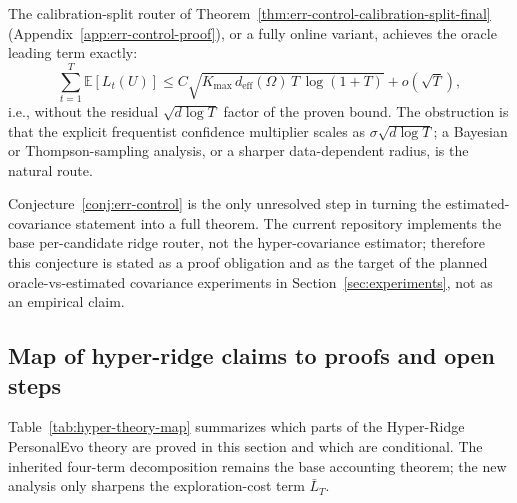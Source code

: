 \documentclass{article} %
\begin{document}
\begin{conjecture}
\label{conj:err-control}
The calibration-split router of Theorem~\ref{thm:err-control-calibration-split-final} (Appendix~\ref{app:err-control-proof}), or a fully online variant, achieves the oracle leading term exactly:
\begin{equation}
\label{eq:hyper-conj-err}
\sum_{t=1}^{T}\mathbb{E}[L_t(U)]
\le C\sqrt{K_{\max}\,d_{\mathrm{eff}}(\Omega)\,T\,\log(1+T)}
+ o(\sqrt{T}),
\end{equation}
i.e., without the residual $\sqrt{d\log T}$ factor of the proven bound. The obstruction is that the explicit frequentist confidence multiplier scales as $\sigma\sqrt{d\log T}$; a Bayesian or Thompson-sampling analysis, or a sharper data-dependent radius, is the natural route.
\end{conjecture}

Conjecture~\ref{conj:err-control} is the only unresolved step in turning the estimated-covariance statement into a full theorem.  The current repository implements the base per-candidate ridge router, not the hyper-covariance estimator; therefore this conjecture is stated as a proof obligation and as the target of the planned oracle-vs-estimated covariance experiments in Section~\ref{sec:experiments}, not as an empirical claim.

\subsection{Map of hyper-ridge claims to proofs and open steps}
\label{sec:theory-hyper-map}

Table~\ref{tab:hyper-theory-map} summarizes which parts of the Hyper-Ridge PersonalEvo theory are proved in this section and which are conditional.  The inherited four-term decomposition remains the base accounting theorem; the new analysis only sharpens the exploration-cost term \(\bar L_T\).
\end{document}
